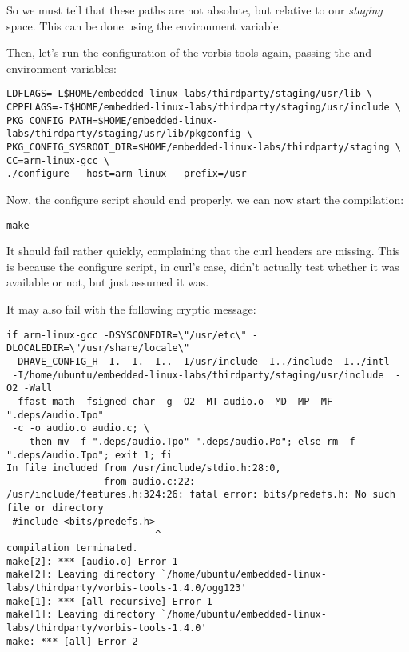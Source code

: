 So we must tell  that these paths are not absolute,
but relative to our {\em staging} space. This can be done using the
 environment variable.

Then, let's run the configuration of the vorbis-tools again, passing
the  and 
environment variables:

\small
\begin{verbatim}
LDFLAGS=-L$HOME/embedded-linux-labs/thirdparty/staging/usr/lib \
CPPFLAGS=-I$HOME/embedded-linux-labs/thirdparty/staging/usr/include \
PKG_CONFIG_PATH=$HOME/embedded-linux-labs/thirdparty/staging/usr/lib/pkgconfig \
PKG_CONFIG_SYSROOT_DIR=$HOME/embedded-linux-labs/thirdparty/staging \
CC=arm-linux-gcc \
./configure --host=arm-linux --prefix=/usr
\end{verbatim}
\normalsize

Now, the configure script should end properly, we can now start the
compilation:
\begin{verbatim}
make
\end{verbatim}

It should fail rather quickly, complaining that the curl headers are
missing. This is because the configure script, in curl's case, didn't
actually test whether it was available or not, but just assumed it was.

It may also fail with the following cryptic message:
\footnotesize
\begin{verbatim}
if arm-linux-gcc -DSYSCONFDIR=\"/usr/etc\" -DLOCALEDIR=\"/usr/share/locale\"
 -DHAVE_CONFIG_H -I. -I. -I.. -I/usr/include -I../include -I../intl
 -I/home/ubuntu/embedded-linux-labs/thirdparty/staging/usr/include  -O2 -Wall
 -ffast-math -fsigned-char -g -O2 -MT audio.o -MD -MP -MF ".deps/audio.Tpo"
 -c -o audio.o audio.c; \
	then mv -f ".deps/audio.Tpo" ".deps/audio.Po"; else rm -f ".deps/audio.Tpo"; exit 1; fi
In file included from /usr/include/stdio.h:28:0,
                 from audio.c:22:
/usr/include/features.h:324:26: fatal error: bits/predefs.h: No such file or directory
 #include <bits/predefs.h>
                          ^
compilation terminated.
make[2]: *** [audio.o] Error 1
make[2]: Leaving directory `/home/ubuntu/embedded-linux-labs/thirdparty/vorbis-tools-1.4.0/ogg123'
make[1]: *** [all-recursive] Error 1
make[1]: Leaving directory `/home/ubuntu/embedded-linux-labs/thirdparty/vorbis-tools-1.4.0'
make: *** [all] Error 2
\end{verbatim}
\normalsize

